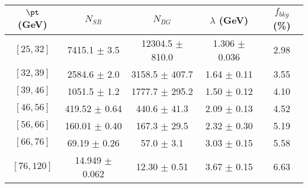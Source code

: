 \begin{tabular}{c||c|c|c||c}
$\pt$ (GeV) & $N_{SR}$ & $N_{BG}$ & $\lambda$ (GeV) & $f_{bkg}$ (\%) \\
\hline
$[25, 32]$ & 7415.1 $\pm$ 3.5 & 12304.5 $\pm$ 810.0 & 1.306 $\pm$ 0.036 & 2.98\\
$[32, 39]$ & 2584.6 $\pm$ 2.0 & 3158.5 $\pm$ 407.7 & 1.64 $\pm$ 0.11 & 3.55\\
$[39, 46]$ & 1051.5 $\pm$ 1.2 & 1777.7 $\pm$ 295.2 & 1.50 $\pm$ 0.12 & 4.10\\
$[46, 56]$ & 419.52 $\pm$ 0.64 & 440.6 $\pm$ 41.3 & 2.09 $\pm$ 0.13 & 4.52\\
$[56, 66]$ & 160.01 $\pm$ 0.40 & 167.3 $\pm$ 29.5 & 2.32 $\pm$ 0.30 & 5.19\\
$[66, 76]$ & 69.19 $\pm$ 0.26 & 57.0 $\pm$ 3.1 & 3.03 $\pm$ 0.15 & 5.58\\
$[76, 120]$ & 14.949 $\pm$ 0.062 & 12.30 $\pm$ 0.51 & 3.67 $\pm$ 0.15 & 6.63\\
\end{tabular}
